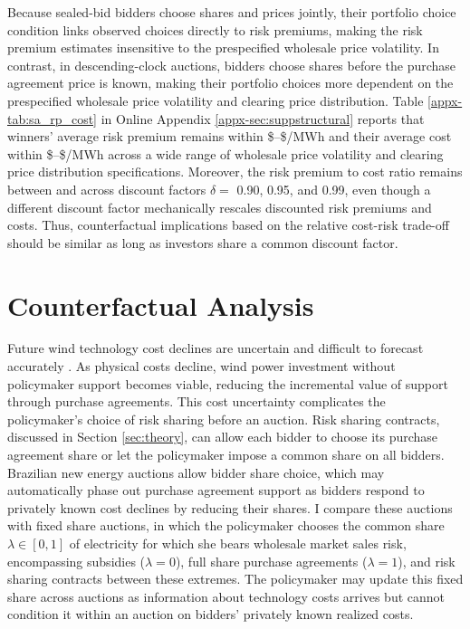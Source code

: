 \documentclass[12pt]{article}
\theoremstyle{definition} %
\begin{document}
Because sealed-bid bidders choose shares and prices jointly, their portfolio choice condition links observed choices directly to risk premiums, making the risk premium estimates insensitive to the prespecified wholesale price volatility. In contrast, in descending-clock auctions, bidders choose shares before the purchase agreement price is known, making their portfolio choices more dependent on the prespecified wholesale price volatility and clearing price distribution. Table \ref{appx-tab:sa_rp_cost} in Online Appendix \ref{appx-sec:suppstructural} reports that winners' average risk premium remains within \$--\$/MWh and their average cost within \$--\$/MWh across a wide range of wholesale price volatility and clearing price distribution specifications. Moreover, the risk premium to cost ratio remains between  and  across discount factors $\delta =$ 0.90, 0.95, and 0.99, even though a different discount factor mechanically rescales discounted risk premiums and costs. Thus, counterfactual implications based on the relative cost-risk trade-off should be similar as long as investors share a common discount factor.

\section{Counterfactual Analysis}
\label{sec:counterfactuals}

Future wind technology cost declines are uncertain and difficult to forecast accurately \citep{Wiser2021}. As physical costs decline, wind power investment without policymaker support becomes viable, reducing the incremental value of support through purchase agreements. This cost uncertainty complicates the policymaker's choice of risk sharing before an auction. Risk sharing contracts, discussed in Section \ref{sec:theory}, can allow each bidder to choose its purchase agreement share or let the policymaker impose a common share on all bidders. Brazilian new energy auctions allow bidder share choice, which may automatically phase out purchase agreement support as bidders respond to privately known cost declines by reducing their shares. I compare these auctions with fixed share auctions, in which the policymaker chooses the common share $\lambda \in [0,1] $ of electricity for which she bears wholesale market sales risk, encompassing subsidies ($\lambda=0$), full share purchase agreements ($\lambda=1$), and risk sharing contracts between these extremes. The policymaker may update this fixed share across auctions as information about technology costs arrives but cannot condition it within an auction on bidders' privately known realized costs.
\end{document}
